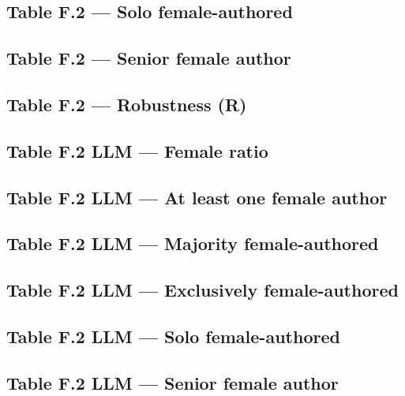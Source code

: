 \documentclass[12pt]{article}
\begin{document}
\subsection{Table F.2 --- Solo female-authored}

\clearpage

\subsection{Table F.2 --- Senior female author}

\clearpage

\subsection{Table F.2 --- Robustness (R)}

\clearpage

\subsection{Table F.2 LLM --- Female ratio}

\clearpage

\subsection{Table F.2 LLM --- At least one female author}

\clearpage

\subsection{Table F.2 LLM --- Majority female-authored}

\clearpage

\subsection{Table F.2 LLM --- Exclusively female-authored}

\clearpage

\subsection{Table F.2 LLM --- Solo female-authored}

\clearpage

\subsection{Table F.2 LLM --- Senior female author}

\clearpage
\end{document}
